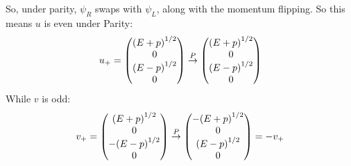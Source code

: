 So, under parity, $\psi_R$ swaps with $\psi_L$, along with the momentum flipping. So this means $u$ is even under Parity:
\begin{align*}
  u_+=\pmqty{{(E+p)}^{1/2}\\0\\{(E-p)}^{1/2}\\0}
  \overset{P}{\rightarrow}\pmqty{{(E+p)}^{1/2}\\0\\{(E-p)}^{1/2}\\0}
\end{align*}
While $v$ is odd:
\begin{align*}
  v_+=\pmqty{{(E+p)}^{1/2}\\0\\-{(E-p)}^{1/2}\\0}
  \overset{P}{\rightarrow}\pmqty{-{(E+p)}^{1/2}\\0\\{(E-p)}^{1/2}\\0}=-v_+
\end{align*}